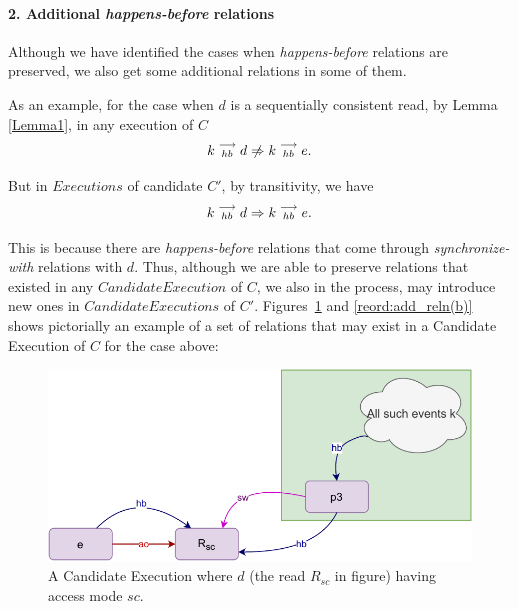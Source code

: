 
\paragraph{2. Additional \textit{happens-before} relations}
    Although we have identified the cases when \textit{happens-before} relations are preserved, we also get some additional relations in some of them.

    As an example, for the case when $d$ is a sequentially consistent read, by Lemma \ref{Lemma1}, in any execution of $C$
    \[
        \reln{k}{hb}{d} \centernot\Rightarrow \reln{k}{hb}{e}. 
    \]

    But in $Executions$ of candidate $C'$, by transitivity, we have 
    \[
        k\stackrel{\longrightarrow}{_{hb}}d \Rightarrow k\stackrel{\longrightarrow}{_{hb}}e. 
    \]

    This is because there are \textit{happens-before} relations that come through \textit{synchronize-with} relations with $d$. 
    Thus, although we are able to preserve relations that existed in any $Candidate Execution$ of $C$, we also in the process, may introduce new ones in $Candidate Executions$ of $C'$. 
    Figures~\ref{reord:add_reln(a)} and \ref{reord:add_reln(b)} shows pictorially an example of a set of relations that may exist in a  Candidate Execution of $C$ for the case above: 
    \begin{figure}[H]
        \centering
        \includegraphics[scale=0.7]{4.InstructionReordering/4.ValidReorderingCandidate/ProofParts/Part2/part2(c).pdf}
        \caption{A Candidate Execution where $d$ (the read $R_{sc}$ in figure) having access mode $sc$.}
        \label{reord:add_reln(a)}
    \end{figure}

